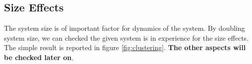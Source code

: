 \documentclass[10pt, a4paper]{report}
\begin{document}
\subsection{Size Effects}
The system size is of important factor for dynamics of the system. By doubling system size, we can checked the given system is in experience for the size effects. The simple result is reported in figure \ref{fig:clustering}. \textbf{The other aspects will be checked later on}.

\end{document}
